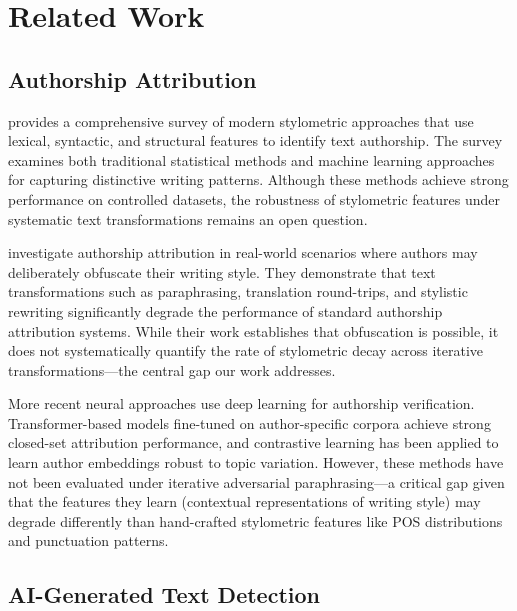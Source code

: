 \section{Related Work}

\subsection{Authorship Attribution}

\citet{stamatatos2009survey} provides a comprehensive survey of modern stylometric approaches that use lexical, syntactic, and structural features to identify text authorship. The survey examines both traditional statistical methods and machine learning approaches for capturing distinctive writing patterns. Although these methods achieve strong performance on controlled datasets, the robustness of stylometric features under systematic text transformations remains an open question.

\citet{koppel2011authorship} investigate authorship attribution in real-world scenarios where authors may deliberately obfuscate their writing style. They demonstrate that text transformations such as paraphrasing, translation round-trips, and stylistic rewriting significantly degrade the performance of standard authorship attribution systems. While their work establishes that obfuscation is possible, it does not systematically quantify the rate of stylometric decay across iterative transformations---the central gap our work addresses.

More recent neural approaches use deep learning for authorship verification. Transformer-based models fine-tuned on author-specific corpora achieve strong closed-set attribution performance, and contrastive learning has been applied to learn author embeddings robust to topic variation. However, these methods have not been evaluated under iterative adversarial paraphrasing---a critical gap given that the features they learn (contextual representations of writing style) may degrade differently than hand-crafted stylometric features like POS distributions and punctuation patterns.

\subsection{AI-Generated Text Detection}

